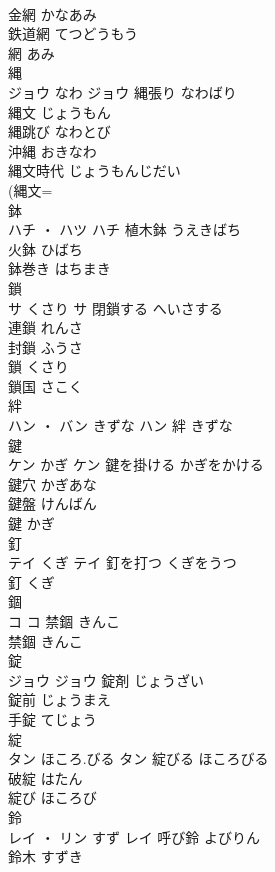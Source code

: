 \documentclass[8pt]{extreport}
\begin{document}
\begin{CJK}{UTF8}{min}
\\	金網	かなあみ	
\\	鉄道網	てつどうもう	
\\	網	あみ	
\\	縄	
\\	ジョウ	なわ	ジョウ	縄張り	なわばり	
\\	縄文	じょうもん	
\\	縄跳び	なわとび	
\\	沖縄	おきなわ	
\\	縄文時代	じょうもんじだい	
\\	(縄文=
\\	鉢	
\\	ハチ ・ ハツ		ハチ	植木鉢	うえきばち	
\\	火鉢	ひばち	
\\	鉢巻き	はちまき	
\\	鎖	
\\	サ	くさり	サ	閉鎖する	へいさする	
\\	連鎖	れんさ	
\\	封鎖	ふうさ	
\\	鎖	くさり	
\\	鎖国	さこく	
\\	絆	
\\	ハン ・ バン	きずな	ハン													絆	きずな	
\\	鍵	
\\	ケン	かぎ	ケン	鍵を掛ける	かぎをかける	
\\	鍵穴	かぎあな	
\\	鍵盤	けんばん	
\\	鍵	かぎ	
\\	釘	
\\	テイ	くぎ	テイ	釘を打つ	くぎをうつ	
\\	釘	くぎ	
\\	錮	
\\	コ		コ	禁錮	きんこ	
\\	禁錮	きんこ	
\\	錠	
\\	ジョウ		ジョウ	錠剤	じょうざい	
\\	錠前	じょうまえ	
\\	手錠	てじょう	
\\	綻	
\\	タン	ほころ.びる	タン	綻びる	ほころびる	
\\	破綻	はたん	
\\	綻び	ほころび	
\\	鈴	
\\	レイ ・ リン	すず	レイ	呼び鈴	よびりん	
\\	鈴木	すずき	

\end{CJK}
\end{document}
